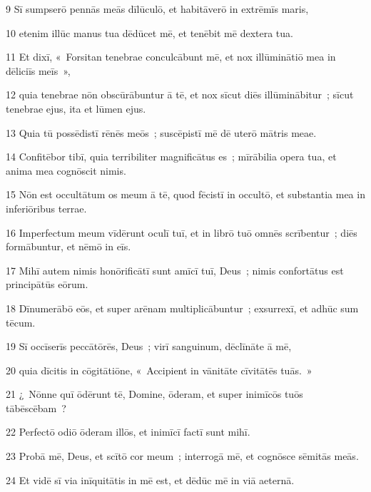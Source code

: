 \psalmVerse
  {\phantom{00}9}
  {Sī sumpserō pennās meās dīlūculō, et habitāverō in extrēmīs maris,}


\psalmVerse
  {\phantom{0}10}
  {etenim illūc manus tua dēdūcet mē, et tenēbit mē dextera tua.}


\psalmVerse
  {\phantom{0}11}
  {Et dixī, «~Forsitan tenebrae conculcābunt mē, et nox illūminātiō mea in dēliciīs meīs~»,}


\psalmVerse
  {\phantom{0}12}
  {quia tenebrae nōn obscūrābuntur ā tē, et nox sīcut diēs illūminābitur~; sīcut tenebrae ejus, ita et lūmen ejus.}


\psalmVerse
  {\phantom{0}13}
  {Quia tū possēdistī rēnēs meōs~; suscēpistī mē dē uterō mātris meae.}


\psalmVerse
  {\phantom{0}14}
  {Confitēbor tibī, quia terribiliter magnificātus es~; mīrābilia opera tua, et anima mea cognōscit nimis.}


\psalmVerse
  {\phantom{0}15}
  {Nōn est occultātum os meum ā tē, quod fēcistī in occultō, et substantia mea in inferiōribus terrae.}


\psalmVerse
  {\phantom{0}16}
  {Imperfectum meum vīdērunt oculī tuī, et in librō tuō omnēs scrībentur~; diēs formābuntur, et nēmō in eīs.}


\psalmVerse
  {\phantom{0}17}
  {Mihī autem nimis honōrificātī sunt amīcī tuī, Deus~; nimis confortātus est principātūs eōrum.}


\psalmVerse
  {\phantom{0}18}
  {Dīnumerābō eōs, et super arēnam multiplicābuntur~; exsurrexī, et adhūc sum tēcum.}


\psalmVerse
  {\phantom{0}19}
  {Sī occīserīs peccātōrēs, Deus~; virī sanguinum, dēclīnāte ā mē,}


\psalmVerse
  {\phantom{0}20}
  {quia dīcitis in cōgitātiōne, «~Accipient in vānitāte cīvitātēs tuās.~»}


\psalmVerse
  {\phantom{0}21}
  {¿~Nōnne quī ōdērunt tē, Domine, ōderam, et super inimīcōs tuōs tābēscēbam~?}


\psalmVerse
  {\phantom{0}22}
  {Perfectō odiō ōderam illōs, et inimīcī factī sunt mihī.}


\psalmVerse
  {\phantom{0}23}
  {Probā mē, Deus, et scītō cor meum~; interrogā mē, et cognōsce sēmitās meās.}


\psalmVerse
  {\phantom{0}24}
  {Et vidē sī via inīquitātis in mē est, et dēdūc mē in viā aeternā.}



